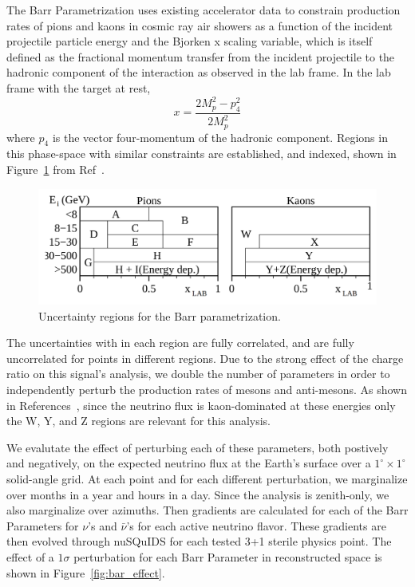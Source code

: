 \documentclass[main.tex]{subfiles}
\begin{document}
The Barr Parametrization uses existing accelerator data to constrain production rates of pions and kaons in cosmic ray air showers as a function of the incident projectile particle energy and the Bjorken x scaling variable, which is itself defined as the fractional momentum transfer from the incident projectile to the hadronic component of the interaction as observed in the lab frame. 
In the lab frame with the target at rest, 
\begin{equation}
    x = \dfrac{ 2M_{p}^{2} - p_{4}^{2}}{2M_{p}^{2}}
\end{equation}
where $p_{4}$ is the vector four-momentum of the hadronic component. 
Regions in this phase-space with similar constraints are established, and indexed, shown in Figure~\ref{fig:bar_letters} from Ref~\cite{PhysRevD.74.094009}. 
\begin{figure}
    \centering
    \includegraphics[width=0.7\linewidth]{./figures/barr_letters.png}
    \caption{Uncertainty regions for the Barr parametrization.}\label{fig:bar_letters}
\end{figure}
The uncertainties with in each region are fully correlated, and are fully uncorrelated for points in different regions.
Due to the strong effect of the charge ratio on this signal's analysis, we double the number of parameters in order to independently perturb the production rates of mesons and anti-mesons. 
As shown in References~\cite{Aartsen_2020, Aartsen_2020_prd, axani2020sterile}, since the neutrino flux is kaon-dominated at these energies only the W, Y, and Z regions are relevant for this analysis. 

We evalutate the effect of perturbing each of these parameters, both postively and negatively, on the expected neutrino flux at the Earth's surface over a $1^{\circ}\times 1^{\circ}$ solid-angle grid. 
At each point and for each different perturbation, we marginalize over months in a year and hours in a day. 
Since the analysis is zenith-only, we also marginalize over azimuths. 
Then gradients are calculated for each of the Barr Parameters for $\nu$'s and $\bar{\nu}$'s for each active neutrino flavor.
These gradients are then evolved through nuSQuIDS for each tested 3+1 sterile physics point. 
The effect of a $1\sigma$ perturbation for each Barr Parameter in reconstructed space is shown in Figure~\ref{fig:bar_effect}.
\end{document}
